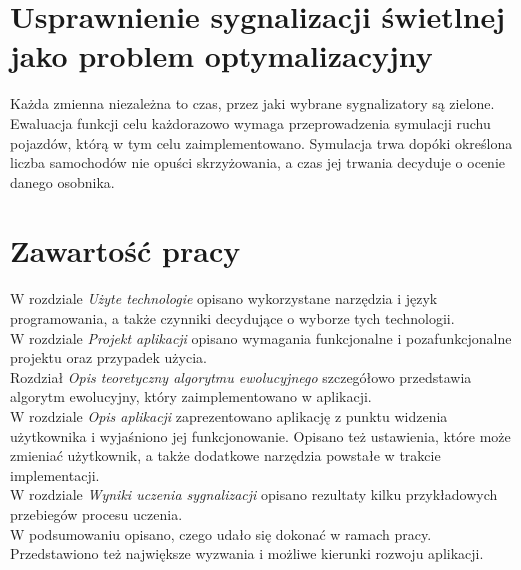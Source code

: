 \section*{Usprawnienie sygnalizacji świetlnej jako problem optymalizacyjny}
Każda zmienna niezależna to czas, przez jaki wybrane sygnalizatory są zielone. Ewaluacja funkcji celu każdorazowo wymaga przeprowadzenia symulacji ruchu pojazdów, którą w tym celu zaimplementowano. Symulacja trwa dopóki określona liczba samochodów nie opuści skrzyżowania, a czas jej trwania decyduje o ocenie danego osobnika. \\
\section*{Zawartość pracy}
W rozdziale \textit{Użyte technologie} opisano wykorzystane narzędzia i język programowania, a także czynniki decydujące o wyborze tych technologii.\\
W rozdziale \textit{Projekt aplikacji} opisano wymagania funkcjonalne i pozafunkcjonalne projektu oraz przypadek użycia.\\
Rozdział \textit{Opis teoretyczny algorytmu ewolucyjnego} szczegółowo przedstawia algorytm ewolucyjny, który zaimplementowano w aplikacji.\\
W rozdziale \textit{Opis aplikacji} zaprezentowano aplikację z punktu widzenia użytkownika i wyjaśniono jej funkcjonowanie. Opisano też ustawienia, które może zmieniać użytkownik, a także dodatkowe narzędzia powstałe w trakcie implementacji.\\
W rozdziale \textit{Wyniki uczenia sygnalizacji} opisano rezultaty kilku przykładowych przebiegów procesu uczenia.\\
W podsumowaniu opisano, czego udało się dokonać w ramach pracy. Przedstawiono też największe wyzwania i możliwe kierunki rozwoju aplikacji.